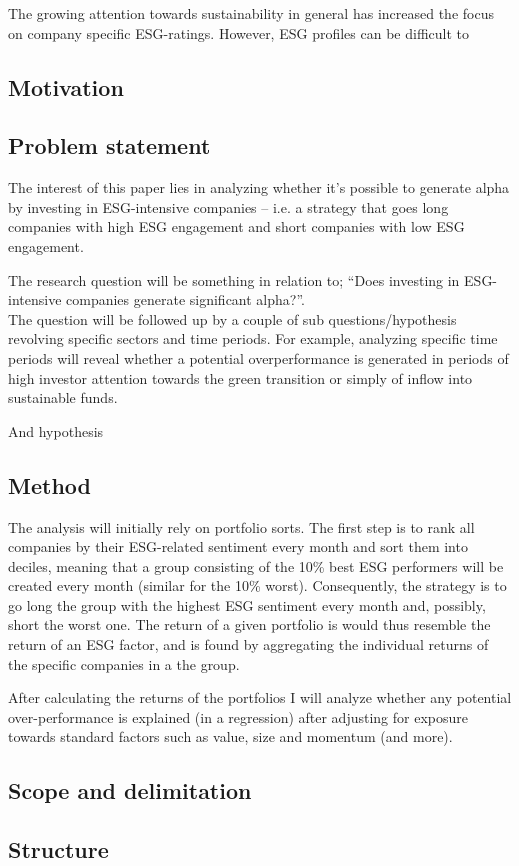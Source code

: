 The growing attention towards sustainability in general has increased the focus on company specific ESG-ratings. However, ESG profiles can be difficult to







\subsection{Motivation}

\subsection{Problem statement}

The interest of this paper lies in analyzing whether it’s possible to generate alpha by investing in ESG-intensive companies – i.e.
a strategy that goes long companies with high ESG engagement and short companies with low ESG engagement. 

The research question will be something in relation to; “Does investing in ESG-intensive companies generate significant alpha?”. \\

The question will be followed up by a couple of sub questions/hypothesis revolving specific sectors and time periods. For example, analyzing specific time periods will reveal whether a potential overperformance is generated in periods of high investor attention towards the green transition or simply of inflow into sustainable funds. 

And hypothesis
\subsection{Method}

The analysis will initially rely on portfolio sorts. The first step is to rank all companies by their ESG-related sentiment every month and sort them into deciles, meaning that a group consisting of the 10\% best ESG performers will be created every month (similar for the 10\% worst). Consequently, the strategy is to go long the group with the highest ESG sentiment every month and, possibly, short the worst one. The return of a given portfolio is would thus resemble the return of an ESG factor, and is found by aggregating the individual returns of the specific companies in a the group.  

After calculating the returns of the portfolios I will analyze whether any potential over-performance is explained (in a regression) after adjusting for exposure towards standard factors such as value, size and momentum (and more).
\subsection{Scope and delimitation}

\subsection{Structure}
